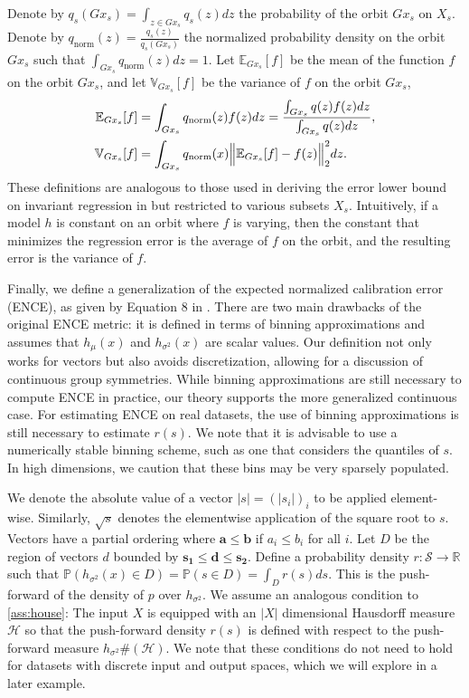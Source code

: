 \documentclass[10pt]{article} %
\theoremstyle{definition}
\begin{document}
Denote by $q_s(Gx_s) = \int_{z \in Gx_s} q_s(z)dz$ the probability of the orbit $Gx_s$ on $X_s$. Denote by $q_{\text{norm}}(z) = \frac{q_s(z)}{q_s(Gx_s)}$ the normalized probability density on the orbit $Gx_s$ such that $\int_{Gx_s}q_{\text{norm}}(z)dz = 1$. Let $\mathbb{E}_{Gx_s}[f]$ be the mean of the function $f$ on the orbit $Gx_s$, and let $\mathbb{V}_{Gx_s}[f]$ be the variance of $f$ on the orbit $Gx_s$,
%
\begin{align*}
    \mathbb{E}_{Gx_s}[f] &=\int_{Gx_s} q_{\text{norm}}(z)f(z)dz =  \frac{\int_{Gx_s} q(z)f(z)dz}{\int_{Gx_s}q(z)dz},\\
    \mathbb{V}_{Gx_s}[f] &= \int_{Gx_s} q_{\text{norm}}(x) \Bigl \lVert \mathbb{E}_{Gx_s} [f] - f(z) \Bigr \rVert_2^2 dz.
\end{align*}
%
These definitions are analogous to those used in deriving the error lower bound on invariant regression in \cite{wang2024general} but restricted to various subsets $X_s$. Intuitively, if a model $h$ is constant on an orbit where $f$ is varying, then the constant that minimizes the regression error is the average of $f$ on the orbit, and the resulting error is the variance of $f$.

Finally, we define a generalization of the expected normalized calibration error (ENCE), as given by Equation 8 in \cite{levi2022evaluating}. There are two main drawbacks of the original ENCE metric: it is defined in terms of binning approximations and assumes that $h_\mu(x)$ and $h_{\sigma^2}(x)$ are scalar values. Our definition not only works for vectors but also avoids discretization, allowing for a discussion of continuous group symmetries. While binning approximations are still necessary to compute ENCE in practice, our theory supports the more generalized continuous case. For estimating ENCE on real datasets, the use of binning approximations is still necessary to estimate $r(s)$. We note that it is advisable to use a numerically stable binning scheme, such as one that considers the quantiles of $s$. In high dimensions, we caution that these bins may be very sparsely populated.

We denote the absolute value of a vector $| s | = (|s_i|)_i$ to be applied element-wise. Similarly, $\sqrt{s}$ denotes the elementwise application of the square root to $s$. Vectors have a partial ordering where $\mathbf{a} \leq \mathbf{b}$ if $a_i \leq b_i$ for all $i$. Let $D$ be the region of vectors $d$ bounded by $\mathbf{s_1} \leq \mathbf{d} \leq \mathbf{s_2}$. Define a probability density $r\colon  \mathcal{S} \to \mathbb{R}$ such that $\mathbb{P}(h_{\sigma^2}(x)  \in D) = \mathbb{P}(s  \in D) = \int_{D} r(s)ds$. This is the push-forward of the density of $p$ over $h_{\sigma^2}$. We assume an analogous condition to \cref{ass:house}: The input $X$ is equipped with an $|X|$ dimensional Hausdorff measure $\mathcal{H}$ so that the push-forward density $r(s)$ is defined with respect to the push-forward measure $h_{\sigma^2}\#(\mathcal{H})$. We note that these conditions do not need to hold for datasets with discrete input and output spaces, which we will explore in a later example.
\end{document}
